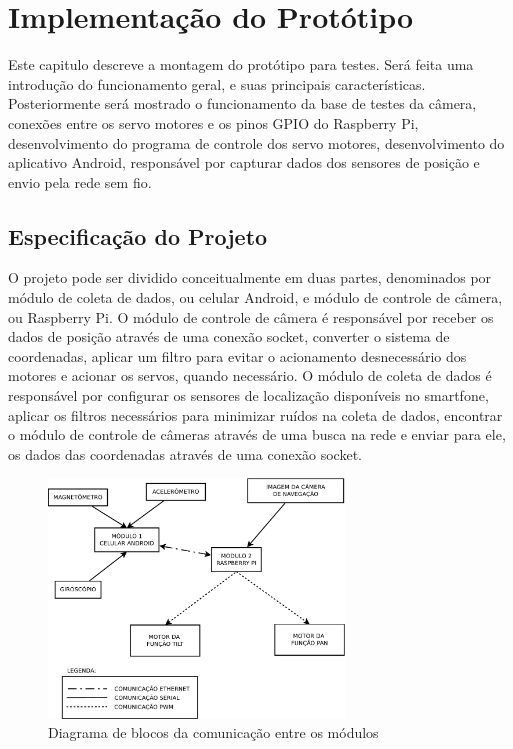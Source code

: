 
\chapter{Implementação do Protótipo}
\label{chap:prototipo}

Este capitulo descreve a montagem do protótipo para testes. Será feita uma introdução do funcionamento geral, e suas principais características. Posteriormente será mostrado o funcionamento da base de testes da câmera, conexões entre os servo motores e os pinos GPIO do Raspberry Pi, desenvolvimento do programa de controle dos servo motores, desenvolvimento do aplicativo Android, responsável por capturar dados dos sensores de posição e envio pela rede sem fio.

\section{Especificação do Projeto}
\label{sec:especificacao}

O projeto pode ser dividido conceitualmente em duas partes, denominados por módulo de coleta de dados, ou celular Android, e módulo de controle de câmera, ou Raspberry Pi. O módulo de controle de câmera é responsável por receber os dados de posição através de uma conexão socket, converter o sistema de coordenadas, aplicar um filtro para evitar o acionamento desnecessário dos motores e acionar os servos, quando necessário. O módulo de coleta de dados é responsável por configurar os sensores de localização disponíveis no smartfone, aplicar os filtros necessários para minimizar ruídos na coleta de dados, encontrar o módulo de controle de câmeras através de uma busca na rede e enviar para ele, os dados das coordenadas através de uma conexão socket. \par

\begin{figure}[H]
	\centering
	\includegraphics[width=0.7\textwidth]{figuras/diagrama-modulos-eps-converted-to.pdf}
	\caption{Diagrama de blocos da comunicação entre os módulos}
	\label{fig:diagrama_blocos}
\end{figure}

